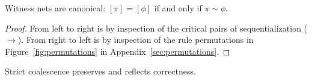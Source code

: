 \documentclass[UKenglish]{lipics-v2019}
\newcommand\+{+}
\renewcommand\*{\times}
\newcommand\scoal{\rightarrow} %
\begin{document}
\addtocounter{retheorem}{-1}
\begin{retheorem}
Witness nets are canonical: $[\pi]=[\phi]$ if and only if $\pi\sim\phi$.
\end{retheorem}

\begin{proof}
From left to right is by inspection of the critical pairs of sequentialization ($\scoal$). From right to left is by inspection of the rule permutations in Figure~\ref{fig:permutations} in Appendix~\ref{sec:permutations}.
\end{proof}

\begin{lemma}
\label{lem:correct}
Strict coalescence preserves and reflects correctness.
\end{lemma}
\end{document}
